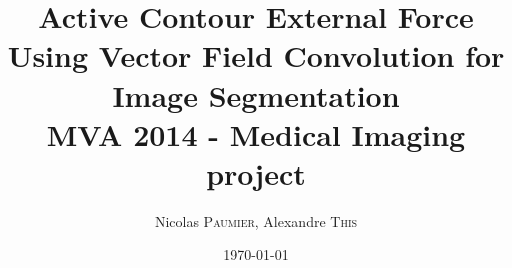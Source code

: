 \documentclass{article}
\title{Active Contour External Force Using Vector
Field Convolution for Image Segmentation \\MVA 2014 - Medical Imaging project} %
\author{Nicolas \textsc{Paumier}, Alexandre \textsc{This}} %
\date{\today} %
\begin{document}
\maketitle %



\setlength\parindent{0pt} %

\renewcommand{\labelenumi}{\alph{enumi}.} %

\tableofcontents

\newpage





\newpage


\end{document}
